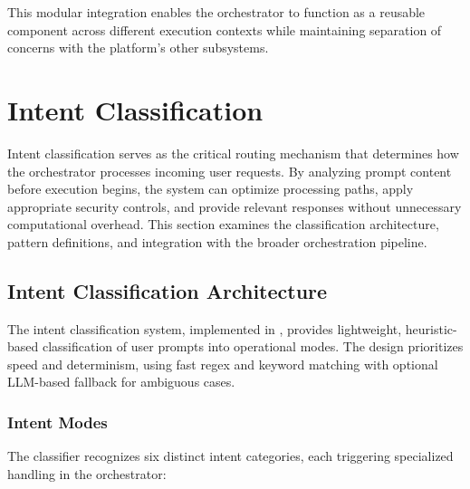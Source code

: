 \documentclass[a4paper,twoside]{sapthesis}
\begin{document}
This modular integration enables the orchestrator to function as a reusable component across different execution contexts while maintaining separation of concerns with the platform's other subsystems.

\section{Intent Classification}
\label{sec:intent-classification}

Intent classification serves as the critical routing mechanism that determines how the orchestrator processes incoming user requests. By analyzing prompt content before execution begins, the system can optimize processing paths, apply appropriate security controls, and provide relevant responses without unnecessary computational overhead. This section examines the classification architecture, pattern definitions, and integration with the broader orchestration pipeline.

\subsection{Intent Classification Architecture}

The intent classification system, implemented in , provides lightweight, heuristic-based classification of user prompts into operational modes. The design prioritizes speed and determinism, using fast regex and keyword matching with optional LLM-based fallback for ambiguous cases.

\subsubsection{Intent Modes}

The classifier recognizes six distinct intent categories, each triggering specialized handling in the orchestrator:
\end{document}
